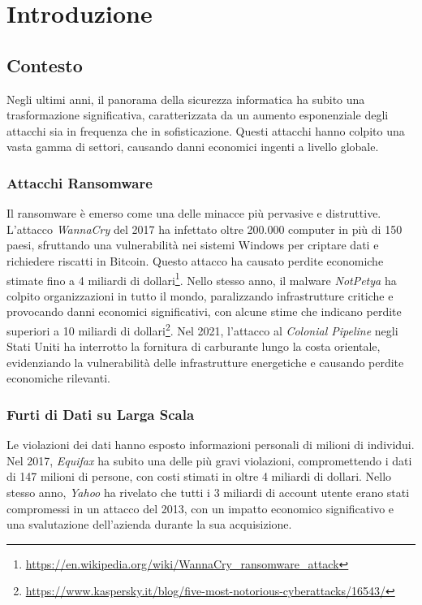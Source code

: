 \chapter{Introduzione}
\label{cap:introduzione}

\section{Contesto}
Negli ultimi anni, il panorama della sicurezza informatica ha subito una trasformazione significativa, caratterizzata da un aumento esponenziale degli attacchi sia in frequenza che in sofisticazione. Questi attacchi hanno colpito una vasta gamma di settori, causando danni economici ingenti a livello globale.

\subsection*{Attacchi Ransomware}
Il ransomware è emerso come una delle minacce più pervasive e distruttive. L'attacco \textit{WannaCry} del 2017 ha infettato oltre 200.000 computer in più di 150 paesi, sfruttando una vulnerabilità nei sistemi Windows per criptare dati e richiedere riscatti in Bitcoin. Questo attacco ha causato perdite economiche stimate fino a 4 miliardi di dollari\footnote{\url{https://en.wikipedia.org/wiki/WannaCry_ransomware_attack}}. Nello stesso anno, il malware \textit{NotPetya} ha colpito organizzazioni in tutto il mondo, paralizzando infrastrutture critiche e provocando danni economici significativi, con alcune stime che indicano perdite superiori a 10 miliardi di dollari\footnote{\url{https://www.kaspersky.it/blog/five-most-notorious-cyberattacks/16543/}}. Nel 2021, l'attacco al \textit{Colonial Pipeline} negli Stati Uniti ha interrotto la fornitura di carburante lungo la costa orientale, evidenziando la vulnerabilità delle infrastrutture energetiche e causando perdite economiche rilevanti.

\subsection*{Furti di Dati su Larga Scala}
Le violazioni dei dati hanno esposto informazioni personali di milioni di individui. Nel 2017, \textit{Equifax} ha subito una delle più gravi violazioni, compromettendo i dati di 147 milioni di persone, con costi stimati in oltre 4 miliardi di dollari. Nello stesso anno, \textit{Yahoo} ha rivelato che tutti i 3 miliardi di account utente erano stati compromessi in un attacco del 2013, con un impatto economico significativo e una svalutazione dell'azienda durante la sua acquisizione.

